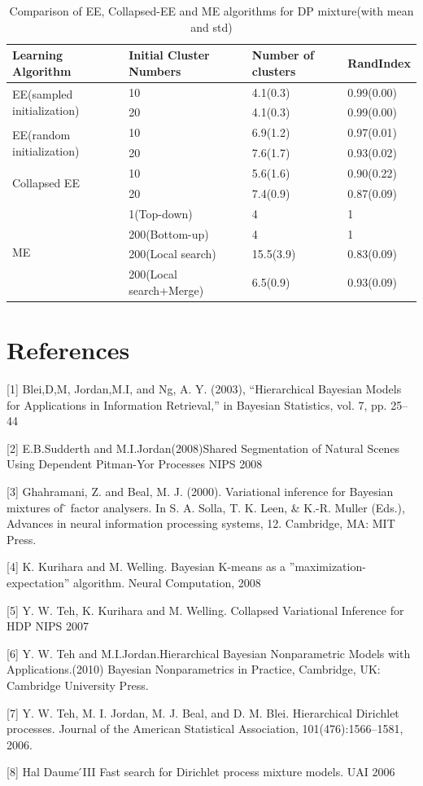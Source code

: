 \documentclass{article}
\begin{document}
\begin{table}[t]
\caption{Comparison of EE, Collapsed-EE and ME algorithms for DP mixture(with mean and std)}
\begin{center}
\begin{tabular}{|l|l|l|l|}

\hline
{\bf Learning Algorithm} &{\bf Initial Cluster Numbers} &{\bf Number of clusters}  &{\bf RandIndex} \\ 
\hline 
\multirow{2}{*}{EE(sampled initialization)} & 10 & 4.1(0.3) & 0.99(0.00) \\
					    & 20 & 4.1(0.3) & 0.99(0.00)\\
\hline
\multirow{2}{*}{EE(random initialization)}  & 10 & 6.9(1.2)&  0.97(0.01) \\
					    & 20 & 7.6(1.7)&  0.93(0.02) \\
\hline
\multirow{2}{*}{Collapsed EE}               & 10 & 5.6(1.6)&  0.90(0.22) \\
					    & 20 & 7.4(0.9)&  0.87(0.09) \\
\hline
\multirow{4}{*}{ME}                         & 1(Top-down) &    4  &  1 \\
					    & 200(Bottom-up) & 4  &  1 \\
					    & 200(Local search) & 15.5(3.9)&  0.83(0.09) \\
					    & 200(Local search+Merge) & 6.5(0.9)&  0.93(0.09) \\
\hline
\end{tabular}
\end{center}
\end{table}


\section{References}
\small{
[1]  Blei,D,M, Jordan,M.I, and Ng, A. Y. (2003), “Hierarchical Bayesian Models for Applications 
  in Information Retrieval,” in Bayesian Statistics, vol. 7, pp. 25–44 

[2] E.B.Sudderth and M.I.Jordan(2008)Shared Segmentation of Natural Scenes Using Dependent Pitman-Yor Processes NIPS 2008


[3] Ghahramani, Z. and Beal, M. J. (2000). Variational inference for Bayesian mixtures of                                                          ̈
  factor analysers. In S. A. Solla, T. K. Leen, \& K.-R. Muller (Eds.), Advances in neural
  information processing systems, 12. Cambridge, MA: MIT Press.

[4] K. Kurihara and M. Welling. Bayesian K-means as a
 ”maximization-expectation” algorithm. Neural Computation, 2008

[5] Y. W. Teh, K. Kurihara and M. Welling. Collapsed Variational Inference for HDP
NIPS 2007

[6] Y. W. Teh and M.I.Jordan.Hierarchical Bayesian Nonparametric Models with Applications.(2010) Bayesian 
Nonparametrics in Practice, Cambridge, UK: Cambridge University Press.

[7] Y. W. Teh, M. I. Jordan, M. J. Beal, and D. M. Blei. Hierarchical Dirichlet processes. Journal of the 
American Statistical Association, 101(476):1566–1581, 2006.

[8] Hal Daume ́III Fast search for Dirichlet process mixture models. UAI 2006
}
\end{document}
